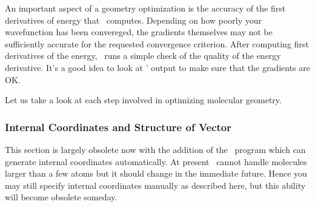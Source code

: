 An important aspect of a geometry optimization is the accuracy
of the first derivatives of energy that \PSIthree\ computes.
Depending on how poorly your wavefunction has been convereged, the
gradients themselves may not be sufficiently accurate for
the requested convergence criterion. After computing first
derivatives of the energy, \PSIcints\ runs a simple check
of the quality of the energy derivative. It's a good idea to
look at \PSIcints ' output to make sure that the gradients are OK. 

Let us take a look at each step involved in optimizing molecular geometry.

\subsubsection{Internal Coordinates and Structure of  Vector}
This section is largely obsolete now with the addition of the \PSIoptking\ 
program which can generate internal coordinates automatically. At present
\PSIoptking\ cannot handle molecules larger than a few
atoms but it should change in the immediate future. Hence 
you may still specify internal coordinates manually
as described here, but this ability will become obsolete someday.

